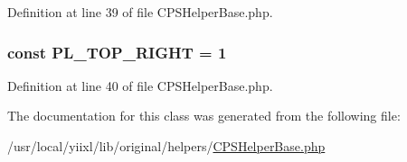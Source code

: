 Definition at line 39 of file CPSHelperBase.php.

\hypertarget{classCPSHelperBase_ab2d49310ee456748bb800d490fcc9e89}{
\subsubsection[{PL\_\-TOP\_\-RIGHT}]{\setlength{\rightskip}{0pt plus 5cm}const {\bf PL\_\-TOP\_\-RIGHT} = 1}}
\label{classCPSHelperBase_ab2d49310ee456748bb800d490fcc9e89}


Definition at line 40 of file CPSHelperBase.php.



The documentation for this class was generated from the following file:\begin{DoxyCompactItemize}
\item 
/usr/local/yiixl/lib/original/helpers/\hyperlink{CPSHelperBase_8php}{CPSHelperBase.php}\end{DoxyCompactItemize}
